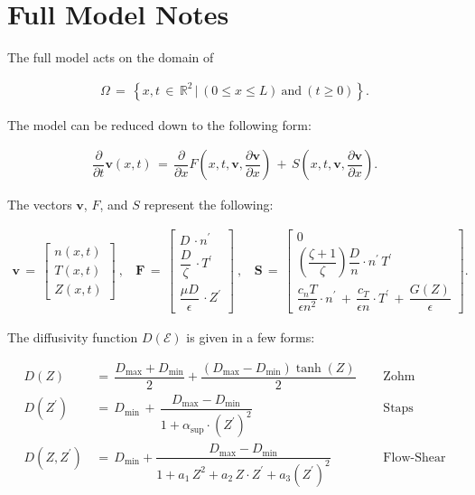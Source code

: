 \documentclass[a4paper,10pt]{article}
\date{}
\begin{document}
\section{Full Model Notes}\label{full-model-notes}

The full model acts on the domain of

\begin{align}
    \Omega \,=\, \left\{x, t \,\in\, \mathbb{R}^2 \,|\, (0 \leq x \leq L) ~\text{and}~ (t \geq 0)\right\}.
\end{align}

The model can be reduced down to the following form:

\begin{align}
    \dfrac{\partial}{\partial t} \mathbf{v}(x,t) \,=\, \dfrac{\partial}{\partial x} F\left(x, t, \mathbf{v}, \dfrac{\partial\mathbf{v}}{\partial x}\right) \,+\, S\left(x, t, \mathbf{v}, \dfrac{\partial\mathbf{v}}{\partial x}\right).
\end{align}

The vectors \(\mathbf{v}\), \(F\), and \(S\) represent the following:

\begin{align}
\mathbf{v} \,=\,\begin{bmatrix} n(x, t) \\ T(x, t) \\ Z(x, t) \end{bmatrix}~,~~~~
\mathbf{F} \,=\, \begin{bmatrix}
            D\,\cdot n^\prime \\[1ex]
            \dfrac{D}{\zeta}\,\cdot T^\prime \\[2ex]
            \dfrac{\mu D}{\epsilon}\,\cdot Z^\prime
            \end{bmatrix}~,~~~~
\mathbf{S} \,=\, \begin{bmatrix}
            0 \\[1ex]
            \left(\dfrac{\zeta + 1}{\zeta}\right) \dfrac{D}{n} \cdot n^\prime \, T^\prime \\[2ex]
            \dfrac{c_n T}{\epsilon n^2} \cdot n^\prime \,+\, \dfrac{c_T}{\epsilon n} \cdot T^\prime \,+\, \dfrac{G(Z)}{\epsilon}
            \end{bmatrix}.
\end{align}

The diffusivity function \(D(\mathcal{E})\) is given in a few forms:

\begin{align}
    D(Z) \,&=\, \dfrac{D_\text{max} + D_\text{min}}{2} + \dfrac{(D_\text{max} - D_\text{min})\tanh(Z)}{2} ~~~~~~ &\text{Zohm} \\
    D(Z^\prime) \,&=\, D_\text{min} \,+\, \dfrac{D_\text{max} - D_\text{min}}{1 + \alpha_\text{sup}\cdot(Z^\prime)^2} ~~~~~~ &\text{Staps} \\
    D(Z, Z^\prime) \,&=\, D_\text{min} + \dfrac{D_\text{max} - D_\text{min}}{1 + a_1\,Z^2 + a_2\,Z \cdot Z^\prime + a_3\left(Z^\prime\right)^2} ~~~~~~ &\text{Flow-Shear}
\end{align}
\end{document}
